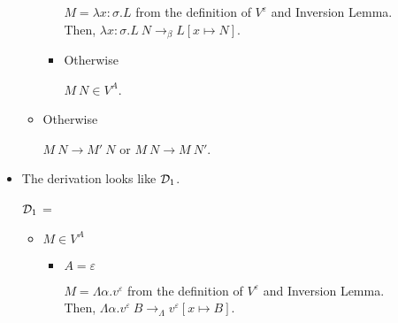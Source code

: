 \begin{itemize}
\begin{itemize}
\begin{itemize}
	      	      	      $M = \lambda x:\sigma.L$ from the definition of $V^\varepsilon$ and Inversion Lemma.\\
	      	      	      Then, $\lambda x:\sigma.L\ N \longrightarrow_\beta L[x\mapsto N]$.
	      	      	\item Otherwise
	      	      	      	      	      	      	      	      	      	      	      	      	      	      	      	      	      	      		      	      	      	      	      	      	      	      	      	      	      	      
	      	      	      $M\ N \in V^A$.
	      	      \end{itemize}
	      	\item Otherwise
	      	      	      	      	      	      	      	      	      	      	      	      		      	      	      	      	      	      	      	      
	      	      $M\ N \longrightarrow M'\ N$ or $M\ N \longrightarrow M\ N'$.
	      \end{itemize}
	      	      	      	      	      	      		      	      	      	      
	\item \TIns
	      	      	      	      	      	      		      	      	      	      
	      The derivation looks like $\mathcal{D}_1$.
	      	      	      	      	      	      		      	      	      	      
	      $\mathcal{D}_1$ = 
	      {}
	      	      	      	      	      	      		      	      	      	      
	      \begin{itemize}
	      	\item $ M \in V^A $
	      	      	      	      	      	      	      	      	      	      	      	      		      	      	      	      	      	      	      	      
	      	      \begin{itemize}
	      	      	\item $A=\varepsilon$
	      	      	      	      	      	      	      	      	      	      	      	      	      	      	      	      	      	      		      	      	      	      	      	      	      	      	      	      	      	      
	      	      	      $M = \Lambda\alpha.v^\varepsilon$ from the definition of $V^\varepsilon$ and Inversion Lemma.\\
	      	      	      Then, $\Lambda\alpha.v^\varepsilon\ B \longrightarrow_\Lambda v^\varepsilon[x\mapsto B]$.
	      	      	      	      	      	      	      	      	      	      	      	      	      	      	      	      	      	      		      	      	      	      	      	      	      	      	      	      	      	      

\end{itemize}
\end{itemize}
\end{itemize}
